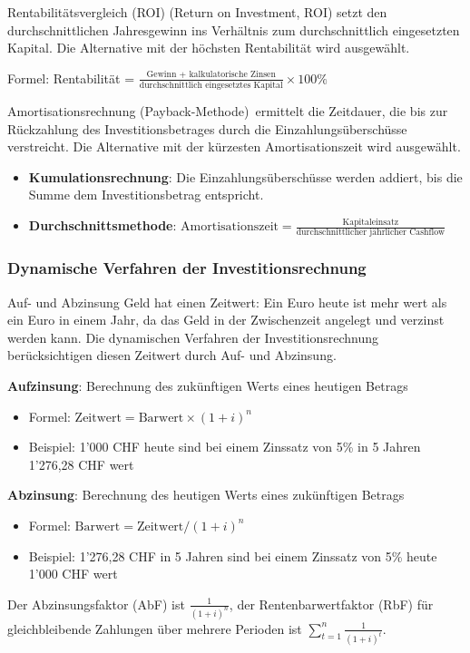 \begin{definition}{Rentabilitätsvergleich (ROI)}
 (Return on Investment, ROI) setzt den durchschnittlichen Jahresgewinn ins Verhältnis zum durchschnittlich eingesetzten Kapital. Die Alternative mit der höchsten Rentabilität wird ausgewählt.

Formel: Rentabilität = $\frac{\text{Gewinn + kalkulatorische Zinsen}}{\text{durchschnittlich eingesetztes Kapital}} \times 100\%$
\end{definition}

\begin{definition}{Amortisationsrechnung (Payback-Methode)}\
 ermittelt die Zeitdauer, die bis zur Rückzahlung des Investitionsbetrages durch die Einzahlungsüberschüsse verstreicht. Die Alternative mit der kürzesten Amortisationszeit wird ausgewählt.
\begin{itemize}
    \item \textbf{Kumulationsrechnung}: Die Einzahlungsüberschüsse werden addiert, bis die Summe dem Investitionsbetrag entspricht.
    \item \textbf{Durchschnittsmethode}: $\text{Amortisationszeit} = \frac{\text{Kapitaleinsatz}}{\text{durchschnittlicher jährlicher Cashflow}}$
\end{itemize}
\end{definition}

\subsubsection{Dynamische Verfahren der Investitionsrechnung}

\begin{concept}{Auf- und Abzinsung}
Geld hat einen Zeitwert: Ein Euro heute ist mehr wert als ein Euro in einem Jahr, da das Geld in der Zwischenzeit angelegt und verzinst werden kann. Die dynamischen Verfahren der Investitionsrechnung berücksichtigen diesen Zeitwert durch Auf- und Abzinsung.

\textbf{Aufzinsung}: Berechnung des zukünftigen Werts eines heutigen Betrags
    \begin{itemize}
        \item Formel: $\text{Zeitwert} = \text{Barwert} \times (1 + i)^n$
        \item Beispiel: 1'000 CHF heute sind bei einem Zinssatz von 5\% in 5 Jahren 1'276,28 CHF wert
    \end{itemize}
     \textbf{Abzinsung}: Berechnung des heutigen Werts eines zukünftigen Betrags
    \begin{itemize}
        \item Formel: $\text{Barwert} = \text{Zeitwert}/(1 + i)^n$
        \item Beispiel: 1'276,28 CHF in 5 Jahren sind bei einem Zinssatz von 5\% heute 1'000 CHF wert
    \end{itemize}

Der Abzinsungsfaktor (AbF) ist $\frac{1}{(1 + i)^n}$, der Rentenbarwertfaktor (RbF) für gleichbleibende Zahlungen über mehrere Perioden ist $\sum_{t=1}^{n} \frac{1}{(1 + i)^t}$.
\end{concept}

